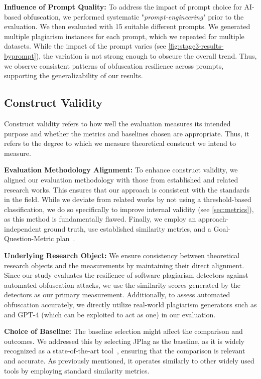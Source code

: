     \textbf{Influence of Prompt Quality:} To address the impact of prompt choice for AI-based obfuscation, we performed systematic "\textit{prompt-engineering}" prior to the evaluation. We then evaluated with 15 suitable different prompts. We generated multiple plagiarism instances for each prompt, which we repeated for multiple datasets. While the impact of the prompt varies (see \autoref{fig:stage3-results-byprompt}), the variation is not strong enough to obscure the overall trend. Thus, we observe consistent patterns of obfuscation resilience across prompts, supporting the generalizability of our results.

\subsection{Construct Validity}
Construct validity refers to how well the evaluation measures its intended purpose and whether the metrics and baselines chosen are appropriate. Thus, it refers to the degree to which we measure theoretical construct we intend to measure.

    \textbf{Evaluation Methodology Alignment:} To enhance construct validity, we aligned our evaluation methodology with those from established and related research works. This ensures that our approach is consistent with the standards in the field. While we deviate from related works by not using a threshold-based classification, we do so specifically to improve internal validity (see \autoref{sec:metrics}), as this method is fundamentally flawed. Finally, we employ an approach-independent ground truth, use established similarity metrics, and a Goal-Question-Metric plan~\cite{Basili1984, Basili1992}.

    \textbf{Underlying Research Object:} We ensure consistency between theoretical research objects and the measurements by maintaining their direct alignment. Since our study evaluates the resilience of software plagiarism detectors against automated obfuscation attacks, we use the similarity scores generated by the detectors as our primary measurement. Additionally, to assess automated obfuscation accurately, we directly utilize real-world plagiarism generators such as \mossad and GPT-4 (which can be exploited to act as one) in our evaluation.
    
    \textbf{Choice of Baseline:} The baseline selection might affect the comparison and outcomes. We addressed this by selecting JPlag as the baseline, as it is widely recognized as a state-of-the-art tool~\cite{Aniceto2021, Novak2019}, ensuring that the comparison is relevant and accurate. As previously mentioned, it operates similarly to other widely used tools by employing standard similarity metrics.

